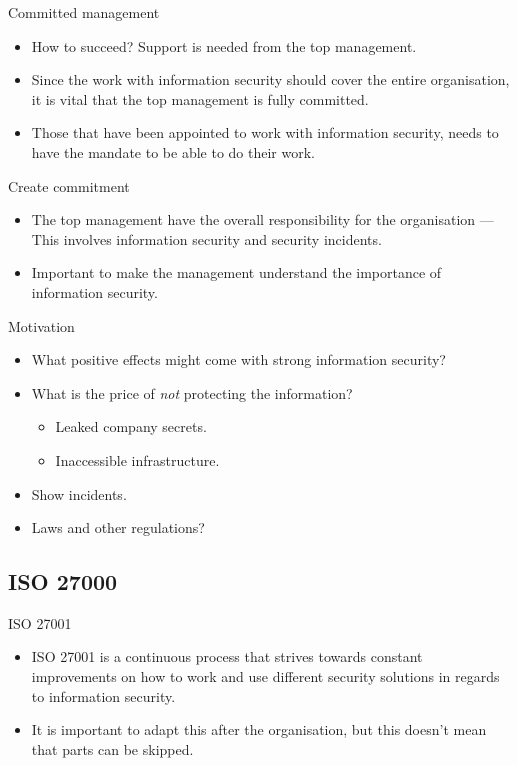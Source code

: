 \documentclass{beamer}
\begin{document}
\begin{frame}{Committed management}
  \begin{itemize}
    \item How to succeed?
      Support is needed from the top management.

    \item Since the work with information security should cover the entire
      organisation, it is vital that the top management is fully committed.

    \item Those that have been appointed to work with information security,
      needs to have the mandate to be able to do their work.

  \end{itemize}
\end{frame}

\begin{frame}{Create commitment}
  \begin{itemize}
    \item The top management have the overall responsibility for the
      organisation --- This involves information security and security incidents.
    \item Important to make the management understand the importance of
      information security.
  \end{itemize}
\end{frame}

\begin{frame}{Motivation}
  \begin{itemize}
    \item What positive effects might come with strong information security?
    \item What is the price of \emph{not} protecting the information?
      \begin{itemize}
        \item Leaked company secrets.
        \item Inaccessible infrastructure.
      \end{itemize}
    \item Show incidents.
    \item Laws and other regulations?
  \end{itemize}
\end{frame}

\subsection{ISO 27000}
\begin{frame}{ISO 27001}
  \begin{itemize}
    \item ISO 27001 is a continuous process that strives towards constant
      improvements on how to work and use different security solutions in
      regards to information security.
    \item It is important to adapt this after the organisation, but this doesn't
      mean that parts can be skipped.
  \end{itemize}
\end{frame}
\end{document}
